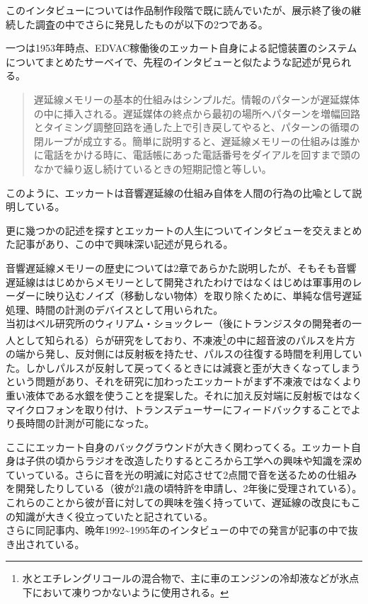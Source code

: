 \documentclass[a4paper,report]{jsbook}
\begin{document}
\autocite{eckertinterview}

このインタビューについては作品制作段階で既に読んでいたが、展示終了後の継続した調査の中でさらに発見したものが以下の2つである。

一つは1953年時点、EDVAC稼働後のエッカート自身による記憶装置のシステムについてまとめたサーベイ\autocite{eckert1953survey}で、先程のインタビューと似たような記述が見られる。

\begin{quote}
遅延線メモリーの基本的仕組みはシンプルだ。情報のパターンが遅延媒体の中に挿入される。遅延媒体の終点から最初の場所へパターンを増幅回路とタイミング調整回路を通した上で引き戻してやると、パターンの循環の閉ループが成立する。簡単に説明すると、遅延線メモリーの仕組みは誰かに電話をかける時に、電話帳にあった電話番号をダイアルを回すまで頭のなかで繰り返し続けているときの短期記憶と等しい。
\end{quote}

このように、エッカートは音響遅延線の仕組み自体を人間の行為の比喩として説明している。

更に幾つかの記述を探すとエッカートの人生についてインタビューを交えまとめた記事\autocite{eckstein1996j}があり、この中で興味深い記述が見られる。

音響遅延線メモリーの歴史については2章であらかた説明したが、そもそも音響遅延線ははじめからメモリーとして開発されたわけではなくはじめは軍事用のレーダーに映り込むノイズ（移動しない物体）を取り除くために、単純な信号遅延処理、時間の計測のデバイスとして用いられた。\\
当初はベル研究所のウィリアム・ショックレー（後にトランジスタの開発者の一人として知られる）らが研究をしており、不凍液\footnote{水とエチレングリコールの混合物で、主に車のエンジンの冷却液などが氷点下において凍りつかないように使用される。}の中に超音波のパルスを片方の端から発し、反対側には反射板を持たせ、パルスの往復する時間を利用していた。しかしパルスが反射して戻ってくるときには減衰と歪が大きくなってしまうという問題があり、それを研究に加わったエッカートがまず不凍液ではなくより重い液体である水銀を使うことを提案した。それに加え反対端に反射板ではなくマイクロフォンを取り付け、トランスデューサーにフィードバックすることでより長時間の計測が可能になった。

ここにエッカート自身のバックグラウンドが大きく関わってくる。エッカート自身は子供の頃からラジオを改造したりするところから工学への興味や知識を深めていっている。さらに音を光の明滅に対応させて2点間で音を送るための仕組みを開発したりしている（彼が21歳の頃特許を申請し、2年後に受理されている\autocite{presper1942light}）。これらのことから彼が音に対しての興味を強く持っていて、遅延線の改良にもこの知識が大きく役立っていたと記されている。\\
さらに同記事内、晩年1992\textasciitilde{}1995年のインタビューの中での発言が記事の中で抜き出されている。
\end{document}

